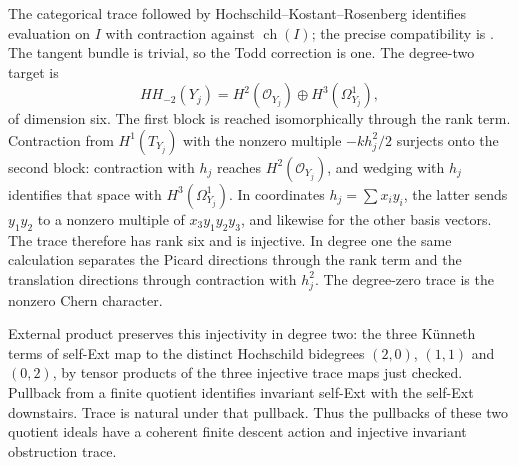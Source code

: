 The categorical trace followed by Hochschild--Kostant--Rosenberg identifies evaluation on $I$ with contraction against $\operatorname{ch}(I)$; the precise compatibility is \cite[Proposition~6.2.1, Corollary~6.3.2 and Theorem~6.4.2, author pp.~29--31]{BFHH}. The tangent bundle is trivial, so the Todd correction is one. The degree-two target is
\[
 HH_{-2}(Y_j)=H^2(\mathcal O_{Y_j})\oplus H^3(\Omega^1_{Y_j}),
\]
of dimension six. The first block is reached isomorphically through the rank term. Contraction from $H^1(T_{Y_j})$ with the nonzero multiple $-kh_j^2/2$ surjects onto the second block: contraction with $h_j$ reaches $H^2(\mathcal O_{Y_j})$, and wedging with $h_j$ identifies that space with $H^3(\Omega^1_{Y_j})$. In coordinates $h_j=\sum x_iy_i$, the latter sends $y_1y_2$ to a nonzero multiple of $x_3y_1y_2y_3$, and likewise for the other basis vectors. The trace therefore has rank six and is injective. In degree one the same calculation separates the Picard directions through the rank term and the translation directions through contraction with $h_j^2$. The degree-zero trace is the nonzero Chern character.

External product preserves this injectivity in degree two: the three K\"unneth terms of self-Ext map to the distinct Hochschild bidegrees $(2,0)$, $(1,1)$ and $(0,2)$, by tensor products of the three injective trace maps just checked. Pullback from a finite quotient identifies invariant self-Ext with the self-Ext downstairs. Trace is natural under that pullback. Thus the pullbacks of these two quotient ideals have a coherent finite descent action and injective invariant obstruction trace.

